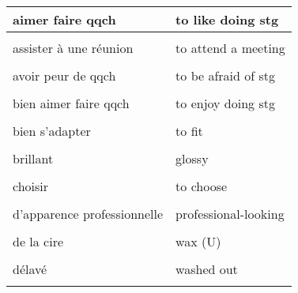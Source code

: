\documentclass[
  10pt,
]{article}
\begin{document}
\begin{longtable}{ll}
\toprule
aimer faire qqch\cellcolor{gray!6}{} & \cellcolor{gray!6}{}to like doing stg\\
\midrule
\cellcolor{gray!6}{ajouter} & \cellcolor{gray!6}{to add}\\

assister à une réunion & to attend a meeting\\

\cellcolor{gray!6}{attentionné} & \cellcolor{gray!6}{caring}\\

avoir peur de qqch & to be afraid of stg\\

\cellcolor{gray!6}{bavard} & \cellcolor{gray!6}{chatty}\\

bien aimer faire qqch & to enjoy doing stg\\

\cellcolor{gray!6}{bien conçu} & \cellcolor{gray!6}{well-designed}\\

bien s'adapter & to fit\\

\cellcolor{gray!6}{blanchir} & \cellcolor{gray!6}{to bleach}\\

brillant & glossy\\

\cellcolor{gray!6}{carton} & \cellcolor{gray!6}{cardboard (U)}\\

choisir & to choose\\

\cellcolor{gray!6}{commander qqch} & \cellcolor{gray!6}{to order stg}\\

d'apparence professionnelle & professional-looking\\

\cellcolor{gray!6}{décrire} & \cellcolor{gray!6}{to describe}\\

de la cire & wax (U)\\

\cellcolor{gray!6}{de la colle} & \cellcolor{gray!6}{glue (U)}\\

délavé & washed out\\

\cellcolor{gray!6}{dépenser (ou passer du temps)} & \cellcolor{gray!6}{to spend}\\


\end{longtable}
\end{document}

